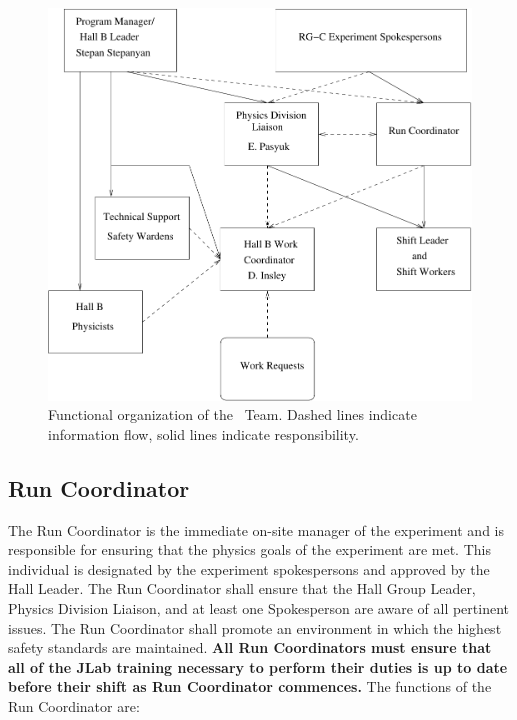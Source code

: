 \documentclass[11pt]{article}
\begin{document}
\begin{figure}
\includegraphics[width=\textwidth]{coo_HallB_CLAS12_rgC_org.pdf}
\caption[Dummy caption.]{Functional organization of the \HALL\ Team. Dashed
lines indicate information flow, solid lines indicate responsibility.}
\label{HALLCHART} 
\end{figure}


\subsection{Run Coordinator}
\indent

The Run Coordinator is the  immediate on-site manager of the experiment 
and is responsible for ensuring that the physics goals of the experiment 
are met. This individual is designated by the experiment spokespersons 
and approved by the Hall Leader.  The Run Coordinator shall ensure that 
the Hall Group Leader, Physics Division Liaison, and at least 
one Spokesperson are aware of all pertinent issues. The Run Coordinator
shall promote an environment in which the highest safety
standards are maintained.
{\bf All Run Coordinators must ensure that all of the JLab training necessary to perform 
their duties is up to date before their shift as Run Coordinator commences.}
The functions of the Run Coordinator  are: 
\end{document}
